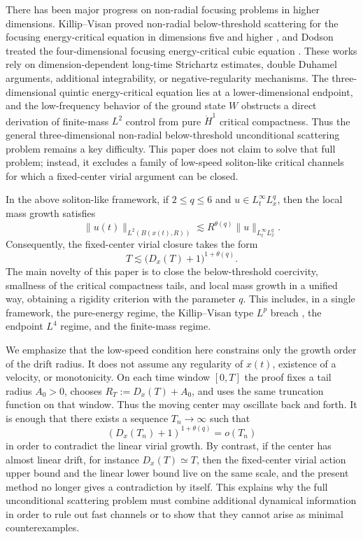 \documentclass[10pt,a4paper]{amsart}
\numberwithin{equation}{section}
\begin{document}
There has been major progress on non-radial focusing problems in higher dimensions. Killip--Visan proved non-radial below-threshold scattering for the focusing energy-critical equation in dimensions five and higher \cite{KillipVisan2010}, and Dodson treated the four-dimensional focusing energy-critical cubic equation \cite{Dodson2019}. These works rely on dimension-dependent long-time Strichartz estimates, double Duhamel arguments, additional integrability, or negative-regularity mechanisms. The three-dimensional quintic energy-critical equation lies at a lower-dimensional endpoint, and the low-frequency behavior of the ground state $W$ obstructs a direct derivation of finite-mass $L^2$ control from pure $\dot H^1$ critical compactness. Thus the general three-dimensional non-radial below-threshold unconditional scattering problem remains a key difficulty. This paper does not claim to solve that full problem; instead, it excludes a family of low-speed soliton-like critical channels for which a fixed-center virial argument can be closed.

In the above soliton-like framework, if $2\le q\le6$ and $u\in L_t^\infty L_x^q$, then the local mass growth satisfies
\[
  \|u(t)\|_{L^2(B(x(t),R))}
  \lesssim R^{\theta(q)}\|u\|_{L_t^\infty L_x^q}.
\]
Consequently, the fixed-center virial closure takes the form
\[
  T\lesssim \bigl(D_x(T)+1\bigr)^{1+\theta(q)}.
\]
The main novelty of this paper is to close the below-threshold coercivity, smallness of the critical compactness tails, and local mass growth in a unified way, obtaining a rigidity criterion with the parameter $q$. This includes, in a single framework, the pure-energy regime, the Killip--Visan type $L^p$ breach \cite{KillipVisan2013}, the endpoint $L^4$ regime, and the finite-mass regime.

We emphasize that the low-speed condition here constrains only the growth order of the drift radius. It does not assume any regularity of $x(t)$, existence of a velocity, or monotonicity. On each time window $[0,T]$ the proof fixes a tail radius $A_0>0$, chooses $R_T:=D_x(T)+A_0$, and uses the same truncation function on that window. Thus the moving center may oscillate back and forth. It is enough that there exists a sequence $T_n\to\infty$ such that
\[
  (D_x(T_n)+1)^{1+\theta(q)}=o(T_n)
\]
in order to contradict the linear virial growth. By contrast, if the center has almost linear drift, for instance $D_x(T)\simeq T$, then the fixed-center virial action upper bound and the linear lower bound live on the same scale, and the present method no longer gives a contradiction by itself. This explains why the full unconditional scattering problem must combine additional dynamical information in order to rule out fast channels or to show that they cannot arise as minimal counterexamples.
\end{document}
